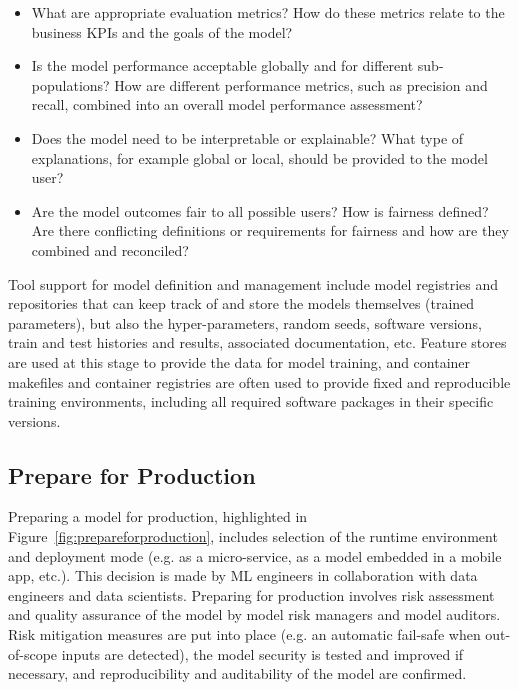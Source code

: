 \begin{itemize}
   \item What are appropriate evaluation metrics? How do these metrics relate to the business KPIs and the goals of the model?
   \item Is the model performance acceptable globally and for different sub-populations? How are different performance metrics, such as precision and recall, combined into an overall model performance assessment?
   \item Does the model need to be interpretable or explainable? What type of explanations, for example global or local, should be provided to the model user? 
   \item Are the model outcomes fair to all possible users? How is fairness defined? Are there conflicting definitions or requirements for fairness and how are they combined and reconciled?
\end{itemize}

Tool support for model definition and management include model registries and repositories that can keep track of and store the models themselves (trained parameters), but also the hyper-parameters, random seeds, software versions, train and test histories and results, associated documentation, etc. Feature stores are used at this stage to provide the data for model training, and container makefiles and container registries are often used to provide fixed and reproducible training environments, including all required software packages in their specific versions.  

\subsection{Prepare for Production}

Preparing a model for production, highlighted in Figure~\ref{fig:prepareforproduction}, includes selection of the runtime environment and deployment mode (e.g. as a micro-service, as a model embedded in a mobile app, etc.). This decision is made by ML engineers in collaboration with data engineers and data scientists. Preparing for production involves risk assessment and quality assurance of the model by model risk managers and model auditors. Risk mitigation measures are put into place (e.g. an automatic fail-safe when out-of-scope inputs are detected), the model security is tested and improved if necessary, and reproducibility and auditability of the model are confirmed. 

